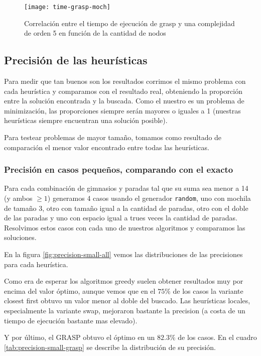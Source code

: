 \begin{figure}[H]
    \centering
    \texttt{[image: time-grasp-moch]}
    \caption{Correlación entre el tiempo de ejecución de grasp y una complejidad de orden 5 en función de la cantidad de nodos}
    \label{fig:time-grasp-moch}
\end{figure}

\subsection{Precisión de las heurísticas}

Para medir que tan buenos son los resultados corrimos el mismo problema con cada heurística y comparamos con el resultado real,
obteniendo la proporción entre la solución encontrada y la buscada. Como el nuestro es un problema de minimización,
las proporciones siempre serán mayores o iguales a 1 (nuestras heurísticas siempre encuentran una solución posible).

Para testear problemas de mayor tamaño, tomamos como resultado de comparación el menor valor encontrado entre todas las heurísticas.

\subsubsection{Precisión en casos pequeños, comparando con el exacto}
\label{sec:precision-small}

Para cada combinación de gimnasios y paradas tal que su suma sea menor a 14 (y ambos $\geq 1$) generamos 4 casos usando el generador \texttt{random},
uno con mochila de tamaño 3, otro con tamaño igual a la cantidad de paradas, otro con el doble de las paradas
y uno con espacio igual a trues veces la cantidad de paradas.
Resolvimos estos casos con cada uno de nuestros algoritmos y comparamos las soluciones.

En la figura \ref{fig:precision-small-all} vemos las distribuciones de las precisiones para cada heurística.

Como era de esperar los algoritmos greedy suelen obtener resultados muy por encima del valor óptimo, aunque vemos que en el $75\%$
de los casos la variante closest first obtuvo un valor menor al doble del buscado.
Las heurísticas locales, especialmente la variante swap, mejoraron bastante la precision (a costa de un tiempo de ejecución bastante mas elevado).

Y por último, el GRASP obtuvo el óptimo en un $82.3\%$ de los casos.
En el cuadro \ref{tab:precision-small-grasp} se describe la distribución de su precisión.

